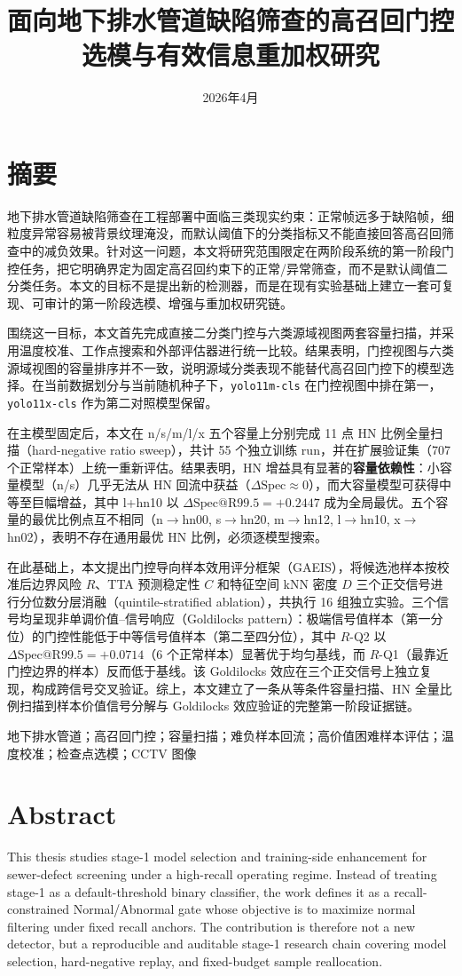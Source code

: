 \documentclass[UTF8,openany,12pt]{ctexbook}
\title{面向地下排水管道缺陷筛查的高召回门控选模与有效信息重加权研究}
\author{}
\date{2026年4月}
\newcommand{\keywords}[1]{\par\noindent{\heiti 关键词：}#1}
\begin{document}
\songti

\frontmatter

\chapter*{摘要}
地下排水管道缺陷筛查在工程部署中面临三类现实约束：正常帧远多于缺陷帧，细粒度异常容易被背景纹理淹没，而默认阈值下的分类指标又不能直接回答高召回筛查中的减负效果。针对这一问题，本文将研究范围限定在两阶段系统的第一阶段门控任务，把它明确界定为固定高召回约束下的正常/异常筛查，而不是默认阈值二分类任务。本文的目标不是提出新的检测器，而是在现有实验基础上建立一套可复现、可审计的第一阶段选模、增强与重加权研究链。

围绕这一目标，本文首先完成直接二分类门控与六类源域视图两套容量扫描，并采用温度校准、工作点搜索和外部评估器进行统一比较。结果表明，门控视图与六类源域视图的容量排序并不一致，说明源域分类表现不能替代高召回门控下的模型选择。在当前数据划分与当前随机种子下，\texttt{yolo11m-cls} 在门控视图中排在第一，\texttt{yolo11x-cls} 作为第二对照模型保留。

在主模型固定后，本文在 n/s/m/l/x 五个容量上分别完成 11 点 HN 比例全量扫描（hard-negative ratio sweep），共计 55 个独立训练 run，并在扩展验证集（707 个正常样本）上统一重新评估。结果表明，HN 增益具有显著的\textbf{容量依赖性}：小容量模型（n/s）几乎无法从 HN 回流中获益（$\Delta\mathrm{Spec} \approx 0$），而大容量模型可获得中等至巨幅增益，其中 l+hn10 以 $\Delta\mathrm{Spec@R99.5} = +0.2447$ 成为全局最优。五个容量的最优比例点互不相同（n$\to$hn00, s$\to$hn20, m$\to$hn12, l$\to$hn10, x$\to$hn02），表明不存在通用最优 HN 比例，必须逐模型搜索。

在此基础上，本文提出门控导向样本效用评分框架（GAEIS），将候选池样本按校准后边界风险 $R$、TTA 预测稳定性 $C$ 和特征空间 kNN 密度 $D$ 三个正交信号进行分位数分层消融（quintile-stratified ablation），共执行 16 组独立实验。三个信号均呈现非单调价值--信号响应（Goldilocks pattern）：极端信号值样本（第一分位）的门控性能低于中等信号值样本（第二至四分位），其中 $R$-Q2 以 $\Delta\mathrm{Spec@R99.5} = +0.0714$（6 个正常样本）显著优于均匀基线，而 $R$-Q1（最靠近门控边界的样本）反而低于基线。该 Goldilocks 效应在三个正交信号上独立复现，构成跨信号交叉验证。综上，本文建立了一条从等条件容量扫描、HN 全量比例扫描到样本价值信号分解与 Goldilocks 效应验证的完整第一阶段证据链。
\keywords{地下排水管道；高召回门控；容量扫描；难负样本回流；高价值困难样本评估；温度校准；检查点选模；CCTV 图像}

\chapter*{Abstract}
This thesis studies stage-1 model selection and training-side enhancement for sewer-defect screening under a high-recall operating regime. Instead of treating stage-1 as a default-threshold binary classifier, the work defines it as a recall-constrained Normal/Abnormal gate whose objective is to maximize normal filtering under fixed recall anchors. The contribution is therefore not a new detector, but a reproducible and auditable stage-1 research chain covering model selection, hard-negative replay, and fixed-budget sample reallocation.
\end{document}
